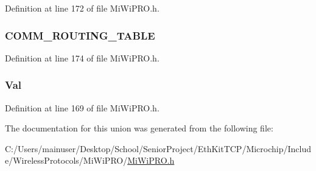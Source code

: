 Definition at line 172 of file Mi\+Wi\+P\+R\+O.\+h.

\hypertarget{union___m_i_w_i___p_r_o___s_t_a_t_u_s_ae15f8390bee21c2b12b020180d1ac112}{}
\subsubsection[{C\+O\+M\+M\+\_\+\+R\+O\+U\+T\+I\+N\+G\+\_\+\+T\+A\+B\+L\+E}]{ C\+O\+M\+M\+\_\+\+R\+O\+U\+T\+I\+N\+G\+\_\+\+T\+A\+B\+L\+E}\label{union___m_i_w_i___p_r_o___s_t_a_t_u_s_ae15f8390bee21c2b12b020180d1ac112}


Definition at line 174 of file Mi\+Wi\+P\+R\+O.\+h.

\hypertarget{union___m_i_w_i___p_r_o___s_t_a_t_u_s_a5ab8c2bf45b20b5f7aa3a4f083896cec}{}
\subsubsection[{Val}]{ Val}\label{union___m_i_w_i___p_r_o___s_t_a_t_u_s_a5ab8c2bf45b20b5f7aa3a4f083896cec}


Definition at line 169 of file Mi\+Wi\+P\+R\+O.\+h.



The documentation for this union was generated from the following file\+:\begin{DoxyCompactItemize}
\item 
C\+:/\+Users/mainuser/\+Desktop/\+School/\+Senior\+Project/\+Eth\+Kit\+T\+C\+P/\+Microchip/\+Include/\+Wireless\+Protocols/\+Mi\+Wi\+P\+R\+O/\hyperlink{_mi_wi_p_r_o_8h}{Mi\+Wi\+P\+R\+O.\+h}\end{DoxyCompactItemize}
